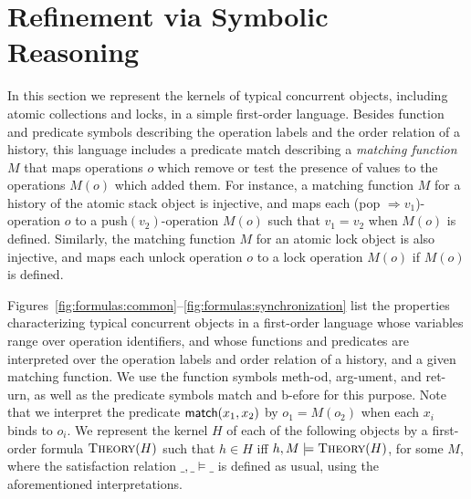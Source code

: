 \section{Refinement via Symbolic Reasoning}
\label{sec:logic}

In this section we represent the kernels of typical concurrent objects,
including atomic collections and locks, in a simple first-order language.
Besides function and predicate symbols describing the operation labels and the
order relation of a history, this language includes a predicate {\sf match}
describing a \emph{matching function} $M$ that maps operations $o$ which remove
or test the presence of values to the operations $M(o)$ which added them. For
instance, a matching function $M$ for a history of the atomic stack object is
injective, and maps each (pop $\Rightarrow v_1$)-operation $o$ to a
push$(v_2)$-operation $M(o)$ such that $v_1 = v_2$ when $M(o)$ is defined.
Similarly, the matching function $M$ for an atomic lock object is also
injective, and maps each unlock operation $o$ to a lock operation $M(o)$ if
$M(o)$ is defined.

Figures~\ref{fig:formulas:common}--\ref{fig:formulas:synchronization} list the
properties characterizing typical concurrent objects in a first-order language
whose variables range over operation identifiers, and whose functions and
predicates are interpreted over the operation labels and order relation of a
history, and a given matching function. We use the function symbols {\sf
meth}-od, {\sf arg}-ument, and {\sf ret}-urn, as well as the predicate symbols
{\sf match} and {\sf b}-efore for this purpose. Note that we interpret the
predicate ${\sf match}(x_1,x_2)$ by $o_1 = M(o_2)$ when each $x_i$ binds to
$o_i$. We represent the kernel $H$ of each of the following objects by a
first-order formula $\textsc{Theory}(H)$ such that $h \in H$ if{f} $h, M
\models \textsc{Theory}(H)$, for some $M$, where the satisfaction relation $\_,
\_ \models \_$ is defined as usual, using the aforementioned interpretations.

